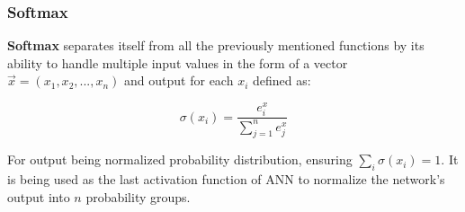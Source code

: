 \subsubsection{Softmax}

\textbf{Softmax} separates itself from all the previously mentioned functions by its ability to handle multiple input values in the form of a vector $\vec{x} = (x_1,x_2,...,x_n)$ and output for each $x_i$ defined as:

\begin{equation}
    {\sigma(x_i) = \frac{e^x_i}{\sum_{j=1}^{n}e^x_j}}
\end{equation}


For output being normalized probability distribution, ensuring $\sum_{i}\sigma(x_i) = 1$.\cite{lipton2015critical} It is being used as the last activation function of ANN to normalize the network's output into $n$ probability groups.
